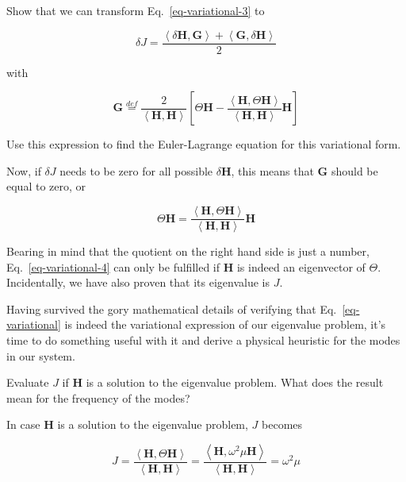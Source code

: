 \begin{exer}
Show that we can transform Eq.~\ref{eq-variational-3} to

$$\delta J = \frac {\left\langle \delta {\mathbf H} , {\mathbf G} \right\rangle + \left\langle {\mathbf G} , \delta {\mathbf H} \right\rangle}{2}$$

with

$${\mathbf G} \stackrel{def}{=} \frac{2}{\left\langle {\mathbf H} , {\mathbf H}\right\rangle } \left[ \Theta {\mathbf H} - \frac{\left\langle {\mathbf H} , \Theta {\mathbf H}\right\rangle}{\left\langle {\mathbf H} , {\mathbf H}\right\rangle} {\mathbf H} \right]  $$
\end{exer}

\begin{cue}
Use this expression to find the Euler-Lagrange equation for this variational form.  
\end{cue}

Now, if $\delta J$ needs to be zero for all possible ${\delta \mathbf H}$, this means that ${\mathbf G}$ should be equal to zero, or

\begin{equation}
\Theta {\mathbf H} = \frac{\left\langle {\mathbf H} , \Theta {\mathbf H}\right\rangle}{\left\langle {\mathbf H} , {\mathbf H}\right\rangle} {\mathbf H} \label{eq-variational-4}
\end{equation} 

Bearing in mind that the quotient on the right hand side is just a number, Eq.~\ref{eq-variational-4} can only be fulfilled if ${\mathbf H}$ is indeed an eigenvector of $\Theta$. Incidentally, we have also proven that its eigenvalue is $J$.

Having survived the gory mathematical details of verifying that Eq.~\ref{eq-variational} is indeed the variational expression of our eigenvalue problem, it's time to do something useful with it and derive a physical heuristic for the modes in our system.

\begin{cue}
Evaluate $J$ if ${\mathbf H}$ is a solution to the eigenvalue problem. What does the result mean for the frequency of the modes?  
\end{cue}
  
In case ${\mathbf H}$ is a solution to the eigenvalue problem, $J$ becomes

\begin{equation}
J =  \frac{\left\langle {\mathbf H} , \Theta {\mathbf H}\right\rangle}{\left\langle {\mathbf H} , {\mathbf H}\right\rangle} = \frac{\left\langle {\mathbf H} , \omega^2 \mu {\mathbf H}\right\rangle}{\left\langle {\mathbf H} , {\mathbf H}\right\rangle} = \omega^2 \mu
\end{equation}

